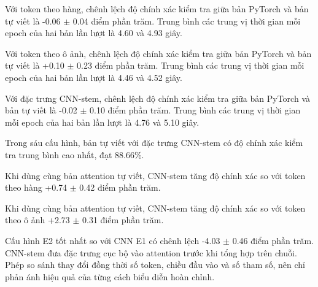 Với token theo hàng, chênh lệch độ chính xác kiểm tra giữa bản PyTorch và bản tự viết là -0.06 $\pm$ 0.04 điểm phần trăm. Trung bình các trung vị thời gian mỗi epoch của hai bản lần lượt là 4.60 và 4.93 giây.

Với token theo ô ảnh, chênh lệch độ chính xác kiểm tra giữa bản PyTorch và bản tự viết là +0.10 $\pm$ 0.23 điểm phần trăm. Trung bình các trung vị thời gian mỗi epoch của hai bản lần lượt là 4.46 và 4.52 giây.

Với đặc trưng CNN-stem, chênh lệch độ chính xác kiểm tra giữa bản PyTorch và bản tự viết là -0.02 $\pm$ 0.10 điểm phần trăm. Trung bình các trung vị thời gian mỗi epoch của hai bản lần lượt là 4.76 và 5.10 giây.

Trong sáu cấu hình, bản tự viết với đặc trưng CNN-stem có độ chính xác kiểm tra trung bình cao nhất, đạt 88.66\%.

Khi dùng cùng bản attention tự viết, CNN-stem tăng độ chính xác so với token theo hàng +0.74 $\pm$ 0.42 điểm phần trăm.

Khi dùng cùng bản attention tự viết, CNN-stem tăng độ chính xác so với token theo ô ảnh +2.73 $\pm$ 0.31 điểm phần trăm.

Cấu hình E2 tốt nhất so với CNN E1 có chênh lệch -4.03 $\pm$ 0.46 điểm phần trăm. CNN-stem đưa đặc trưng cục bộ vào attention trước khi tổng hợp trên chuỗi. Phép so sánh thay đổi đồng thời số token, chiều đầu vào và số tham số, nên chỉ phản ánh hiệu quả của từng cách biểu diễn hoàn chỉnh.
